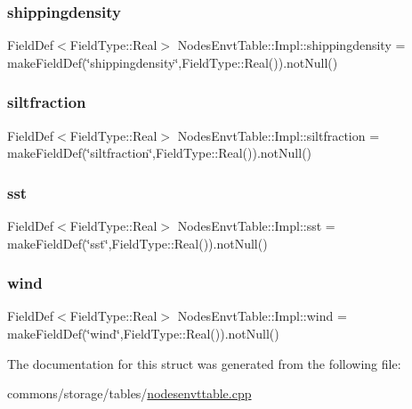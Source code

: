 \mbox{\label{struct_nodes_envt_table_1_1_impl_aaf7fc7f7b8f4e2777d8f660a06c9b75d}} 
\subsubsection{\texorpdfstring{shippingdensity}{shippingdensity}}
{\footnotesize\ttfamily Field\+Def$<$Field\+Type\+::\+Real$>$ Nodes\+Envt\+Table\+::\+Impl\+::shippingdensity = make\+Field\+Def(\char`\"{}shippingdensity\char`\"{},Field\+Type\+::\+Real()).not\+Null()}

\mbox{\label{struct_nodes_envt_table_1_1_impl_a6be200e48ada03ff07aa017b312994fb}} 
\subsubsection{\texorpdfstring{siltfraction}{siltfraction}}
{\footnotesize\ttfamily Field\+Def$<$Field\+Type\+::\+Real$>$ Nodes\+Envt\+Table\+::\+Impl\+::siltfraction = make\+Field\+Def(\char`\"{}siltfraction\char`\"{},Field\+Type\+::\+Real()).not\+Null()}

\mbox{\label{struct_nodes_envt_table_1_1_impl_a40318e2797a84976db33f92985642094}} 
\subsubsection{\texorpdfstring{sst}{sst}}
{\footnotesize\ttfamily Field\+Def$<$Field\+Type\+::\+Real$>$ Nodes\+Envt\+Table\+::\+Impl\+::sst = make\+Field\+Def(\char`\"{}sst\char`\"{},Field\+Type\+::\+Real()).not\+Null()}

\mbox{\label{struct_nodes_envt_table_1_1_impl_a7596d35df8639d90bb7af0e487ead25d}} 
\subsubsection{\texorpdfstring{wind}{wind}}
{\footnotesize\ttfamily Field\+Def$<$Field\+Type\+::\+Real$>$ Nodes\+Envt\+Table\+::\+Impl\+::wind = make\+Field\+Def(\char`\"{}wind\char`\"{},Field\+Type\+::\+Real()).not\+Null()}



The documentation for this struct was generated from the following file\+:\begin{DoxyCompactItemize}
\item 
commons/storage/tables/\mbox{\hyperlink{nodesenvttable_8cpp}{nodesenvttable.\+cpp}}\end{DoxyCompactItemize}
